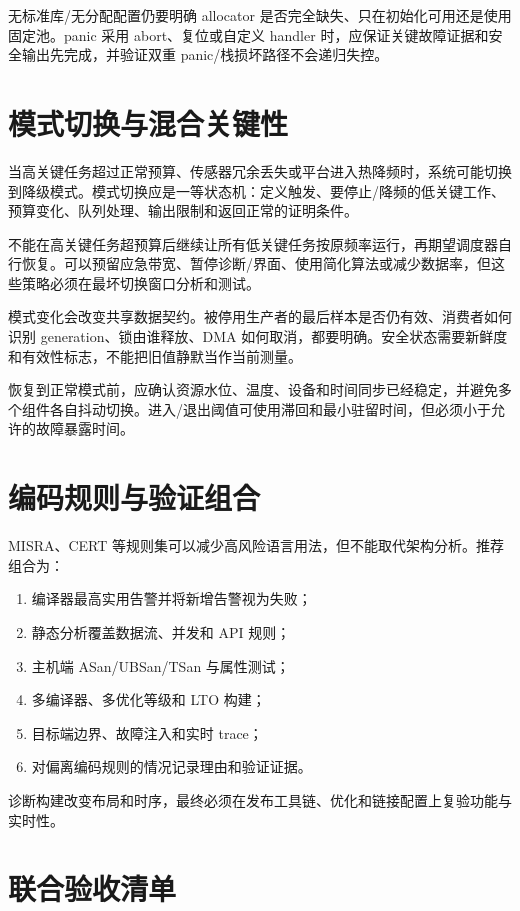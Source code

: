无标准库/无分配配置仍要明确 allocator 是否完全缺失、只在初始化可用还是使用固定池。panic 采用 abort、复位或自定义 handler 时，应保证关键故障证据和安全输出先完成，并验证双重 panic/栈损坏路径不会递归失控。

\section{模式切换与混合关键性}

当高关键任务超过正常预算、传感器冗余丢失或平台进入热降频时，系统可能切换到降级模式。模式切换应是一等状态机：定义触发、要停止/降频的低关键工作、预算变化、队列处理、输出限制和返回正常的证明条件。

不能在高关键任务超预算后继续让所有低关键任务按原频率运行，再期望调度器自行恢复。可以预留应急带宽、暂停诊断/界面、使用简化算法或减少数据率，但这些策略必须在最坏切换窗口分析和测试。

模式变化会改变共享数据契约。被停用生产者的最后样本是否仍有效、消费者如何识别 generation、锁由谁释放、DMA 如何取消，都要明确。安全状态需要新鲜度和有效性标志，不能把旧值静默当作当前测量。

恢复到正常模式前，应确认资源水位、温度、设备和时间同步已经稳定，并避免多个组件各自抖动切换。进入/退出阈值可使用滞回和最小驻留时间，但必须小于允许的故障暴露时间。

\section{编码规则与验证组合}

MISRA、CERT 等规则集可以减少高风险语言用法，但不能取代架构分析。推荐组合为：
\begin{enumerate}
  \item 编译器最高实用告警并将新增告警视为失败；
  \item 静态分析覆盖数据流、并发和 API 规则；
  \item 主机端 ASan/UBSan/TSan 与属性测试；
  \item 多编译器、多优化等级和 LTO 构建；
  \item 目标端边界、故障注入和实时 trace；
  \item 对偏离编码规则的情况记录理由和验证证据。
\end{enumerate}

诊断构建改变布局和时序，最终必须在发布工具链、优化和链接配置上复验功能与实时性。

\section{联合验收清单}

